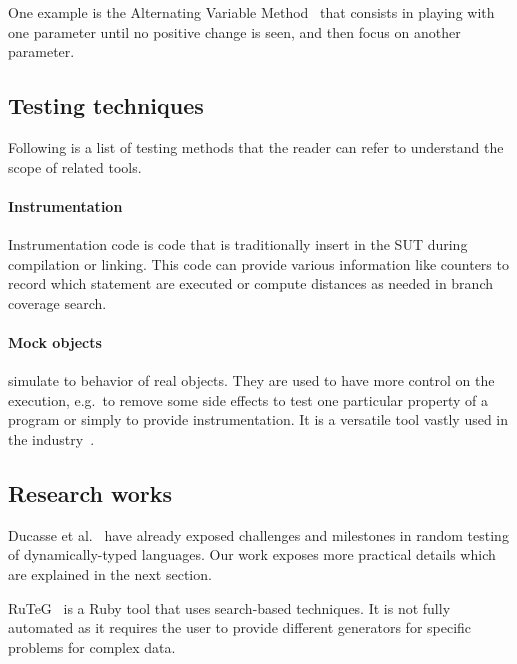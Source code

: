 \documentclass{llncs2e/llncs}
\begin{document}
One example is the Alternating Variable Method~\cite{mcminn2016avmf} that
consists in playing with one parameter until no positive change is seen, and
then focus on another parameter.


\subsection{Testing techniques} %
\label{techniques}

Following is a list of testing methods that the reader can refer to understand
the scope of related tools.

\paragraph{Instrumentation} Instrumentation code is code that is traditionally
insert in the SUT during compilation or linking. This code can provide various
information like counters to record which statement are executed or compute
distances as needed in branch coverage search.

\paragraph{Mock objects} simulate to behavior of real objects. They are used to
have more control on the execution, e.g.\ to remove some side effects to test
one particular property of a program or simply to provide instrumentation. It is
a versatile tool vastly used in the
industry~\cite{mackinnon2000endo,taneja2010moda,freeman2004mock,tillmann2006mock}.


\subsection{Research works}
\label{related_research}

Ducasse et al.~\cite{ducasse2011challenges} have already exposed challenges and
milestones in random testing of dynamically-typed languages. Our work exposes
more practical details which are explained in the next section.

RuTeG~\cite{mairhofer2011search} is a Ruby tool that uses search-based
techniques. It is not fully automated as it requires the user to provide
different generators for specific problems for complex data.
\end{document}
